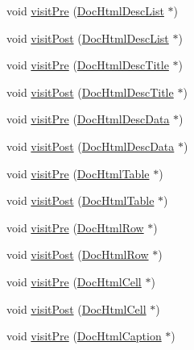 \begin{DoxyCompactItemize}
void \hyperlink{class_docbook_doc_visitor_ae617c326de9187a92ba3926dd6c4ec95}{visit\+Pre} (\hyperlink{class_doc_html_desc_list}{Doc\+Html\+Desc\+List} $\ast$)
\item 
void \hyperlink{class_docbook_doc_visitor_a8ba240f9c81311f3088b83d96a118f3d}{visit\+Post} (\hyperlink{class_doc_html_desc_list}{Doc\+Html\+Desc\+List} $\ast$)
\item 
void \hyperlink{class_docbook_doc_visitor_a265e860f05c360f7533c28cfcc6784db}{visit\+Pre} (\hyperlink{class_doc_html_desc_title}{Doc\+Html\+Desc\+Title} $\ast$)
\item 
void \hyperlink{class_docbook_doc_visitor_a527390301617a1361ed214e1e3587935}{visit\+Post} (\hyperlink{class_doc_html_desc_title}{Doc\+Html\+Desc\+Title} $\ast$)
\item 
void \hyperlink{class_docbook_doc_visitor_a4e278cb27372839e11255d05cf94f71d}{visit\+Pre} (\hyperlink{class_doc_html_desc_data}{Doc\+Html\+Desc\+Data} $\ast$)
\item 
void \hyperlink{class_docbook_doc_visitor_a0227203288437195ac9a683834163233}{visit\+Post} (\hyperlink{class_doc_html_desc_data}{Doc\+Html\+Desc\+Data} $\ast$)
\item 
void \hyperlink{class_docbook_doc_visitor_a32e77da8f522c9b6281eaa2faf8008ce}{visit\+Pre} (\hyperlink{class_doc_html_table}{Doc\+Html\+Table} $\ast$)
\item 
void \hyperlink{class_docbook_doc_visitor_af59d689d992c1c411a77a67cc6befaa7}{visit\+Post} (\hyperlink{class_doc_html_table}{Doc\+Html\+Table} $\ast$)
\item 
void \hyperlink{class_docbook_doc_visitor_a1b3cf11c925bd59582b049efd594f81e}{visit\+Pre} (\hyperlink{class_doc_html_row}{Doc\+Html\+Row} $\ast$)
\item 
void \hyperlink{class_docbook_doc_visitor_ac7d05d89781480adeaed750359bca81a}{visit\+Post} (\hyperlink{class_doc_html_row}{Doc\+Html\+Row} $\ast$)
\item 
void \hyperlink{class_docbook_doc_visitor_a0905c48a1ff04ba0b03cd1d4d3dc8e4c}{visit\+Pre} (\hyperlink{class_doc_html_cell}{Doc\+Html\+Cell} $\ast$)
\item 
void \hyperlink{class_docbook_doc_visitor_a7d6b2dbb9dc8e74e4bd34d831ce1dd46}{visit\+Post} (\hyperlink{class_doc_html_cell}{Doc\+Html\+Cell} $\ast$)
\item 
void \hyperlink{class_docbook_doc_visitor_ad7cf0b1e85fb3d5f9779cdb95ee341ec}{visit\+Pre} (\hyperlink{class_doc_html_caption}{Doc\+Html\+Caption} $\ast$)
\item 

\end{DoxyCompactItemize}
